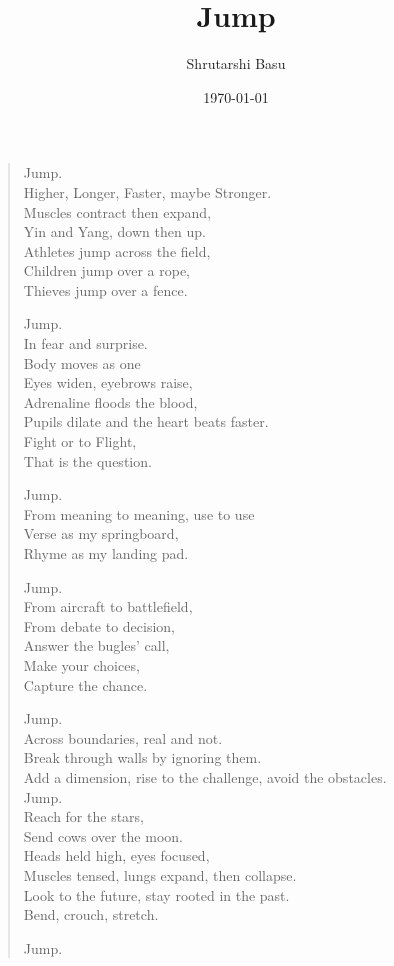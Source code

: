 \documentclass[12pt,letterpaper]{article}
\title{Jump}
\author{Shrutarshi Basu}
\date{\today}
\begin{document}
\maketitle
\begin{verse}

Jump. \\
Higher, Longer, Faster, maybe Stronger. \\
Muscles contract then expand, \\
Yin and Yang, down then up. \\
Athletes jump across the field, \\
Children jump over a rope, \\
Thieves jump over a fence. 

Jump. \\
In fear and surprise.\\
Body moves as one \\
Eyes widen, eyebrows raise, \\
Adrenaline floods the blood, \\
Pupils dilate and the heart beats faster. \\
Fight or to Flight, \\
That is the question.

Jump.\\
From meaning to meaning, use to use\\
Verse as my springboard,\\
Rhyme as my landing pad.

Jump.\\
From aircraft to battlefield,\\
From debate to decision,\\
Answer the bugles' call,\\
Make your choices,\\
Capture the chance.

Jump.\\
Across boundaries, real and not.\\
Break through walls by ignoring them.\\
Add a dimension, rise to the challenge, avoid the obstacles.\\

Jump.\\
Reach for the stars,\\
Send cows over the moon.\\
Heads held high, eyes focused,\\
Muscles tensed, lungs expand, then collapse.\\
Look to the future, stay rooted in the past.\\
Bend, crouch, stretch. 

Jump.\\
\end{verse}

\end{document}
